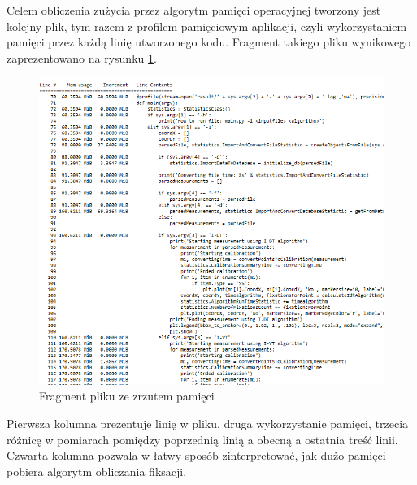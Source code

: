 Celem obliczenia zużycia przez algorytm pamięci operacyjnej tworzony jest kolejny plik, tym razem z profilem pamięciowym aplikacji, czyli wykorzystaniem pamięci przez każdą linię utworzonego kodu. Fragment takiego pliku wynikowego zaprezentowano na rysunku \ref{fig:memoryfile}.
\begin{figure}[H]
        \centering
        \captionsetup{justification=centering,margin=2cm}
        \includegraphics[width=\linewidth]{resources/memory_file.png}
        \caption{Fragment pliku ze zrzutem pamięci}
        \label{fig:memoryfile}
\end{figure}
Pierwsza kolumna prezentuje linię w pliku, druga wykorzystanie pamięci, trzecia różnicę w pomiarach pomiędzy poprzednią linią a obecną a ostatnia treść linii. Czwarta kolumna pozwala w łatwy sposób zinterpretować, jak dużo pamięci pobiera algorytm obliczania fiksacji.
